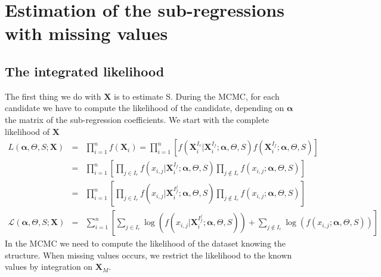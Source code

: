 \documentclass[12pt,a4paper]{report}
\begin{document}
\section{Estimation of the sub-regressions with missing values}
\subsection{The integrated likelihood}
The first thing we do with $\boldsymbol{X}$ is to estimate S.
	 During the MCMC, for each candidate we have to compute the likelihood of the candidate, depending on $\boldsymbol{\alpha}$ the matrix of the sub-regression coefficients.
We start with the complete likelihood of $\boldsymbol{X}$
\begin{eqnarray}
	L(\boldsymbol{\alpha},\Theta,S;\boldsymbol{X})&=& \prod_{i=1}^n f(\boldsymbol{X}_i)= \prod_{i=1}^n\left[f(\boldsymbol{X}_i^{I_r}|\boldsymbol{X}_i^{I_f};\boldsymbol{\alpha},\Theta,S)f(\boldsymbol{X}_i^{I_f};\boldsymbol{\alpha},\Theta,S) \right] \\
	&=&\prod_{i=1}^n\left[\prod_{j \in I_r}f(x_{i,j}|\boldsymbol{X}_i^{I_f};\boldsymbol{\alpha},\Theta,S)\prod_{j \notin I_r} f(x_{i,j};\boldsymbol{\alpha},\Theta,S) \right] \\
	&=&\prod_{i=1}^n\left[\prod_{j \in I_r}f(x_{i,j}|\boldsymbol{X}_i^{I_f^j};\boldsymbol{\alpha},\Theta,S)\prod_{j \notin I_r} f(x_{i,j};\boldsymbol{\alpha},\Theta,S) \right] \\
	\mathcal{L}(\boldsymbol{\alpha},\Theta,S;\boldsymbol{X})&=&\sum_{i=1}^n\left[\sum_{j \in I_r}\log \left(f(x_{i,j}|\boldsymbol{X}_i^{I_f^j};\boldsymbol{\alpha},\Theta,S)\right)+\sum_{j \notin I_r} \log \left(f(x_{i,j};\boldsymbol{\alpha},\Theta,S)\right) \right] \label{loglikmiss}
\end{eqnarray}
		In the MCMC we need to compute the likelihood of the dataset knowing the structure. When missing values occurs, we restrict the likelihood to the known values by integration on $\boldsymbol{X}_M$.
\end{document}
